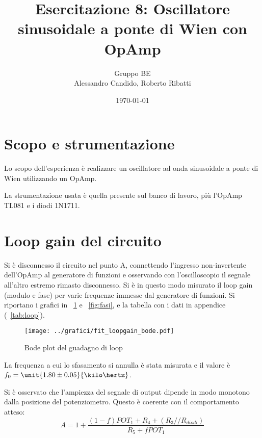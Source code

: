 \documentclass[10pt,a4paper]{article}
\title{Esercitazione 8: Oscillatore sinusoidale a ponte di Wien con OpAmp}
\author{Gruppo BE \\ Alessandro Candido, Roberto Ribatti}
\date{\today}
\begin{document}
\maketitle

\section{Scopo e strumentazione}
Lo scopo dell'esperienza è realizzare un oscillatore ad onda sinusoidale a ponte di Wien utilizzando un OpAmp.

La strumentazione usata è quella presente sul banco di lavoro, più l'OpAmp TL081 e i diodi 1N1711.

\section{Loop gain del circuito}
Si è disconnesso il circuito nel punto A, connettendo l'ingresso non-invertente dell'OpAmp al generatore di funzioni e osservando con l'oscilloscopio il segnale all'altro estremo rimasto disconnesso.
Si è in questo modo misurato il loop gain (modulo e fase) per varie frequenze immesse dal generatore di funzioni. Si riportano i grafici in \figurename{~\ref{fig:Bode}} e \figurename{~\ref{fig:fasi}}, e la tabella con i dati in appendice (\tablename{~\ref{tab:loop}}).

\begin{figure}[H]
	\begin{minipage}{\textwidth}
		\centering
		\texttt{[image: ../grafici/fit\_loopgain\_bode.pdf]}
		\caption{Bode plot del guadagno di loop}
		\label{fig:Bode}
	\end{minipage}
\end{figure}


La frequenza a cui lo sfasamento si annulla è stata misurata e il valore è $f_0 = \unit{1.80 \pm 0.05}{\kilo\hertz}$.

Si è osservato che l'ampiezza del segnale di output dipende in modo monotono dalla posizione del potenziometro. Questo è coerente con il comportamento atteso:
\begin{equation}
A = 1 + \frac{(1-f)POT_1 + R_4 + (R_3//R_{diodi})}{R_5 + f POT_1}
\label{eq:pot}
\end{equation}
\end{document}
